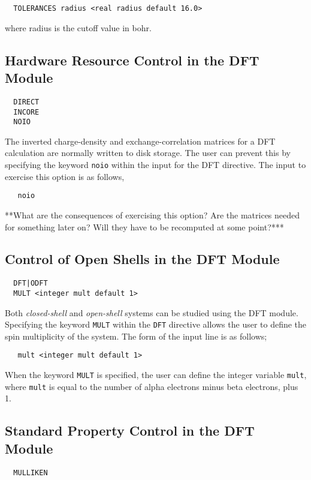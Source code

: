 \begin{verbatim}
  TOLERANCES radius <real radius default 16.0>
\end{verbatim}

where radius is the cutoff value in bohr.


\subsection{Hardware Resource Control in the DFT Module}
\begin{verbatim}
  DIRECT
  INCORE
  NOIO
\end{verbatim}

The inverted charge-density and exchange-correlation matrices
for a DFT calculation are normally written to disk storage.  The user
can prevent this by specifying the keyword \verb+noio+ within the
input for the DFT directive.  The input to exercise this option is
as follows,

\begin{verbatim}
   noio
\end{verbatim}

\Large
**What are the consequences of exercising this option?  Are the matrices
needed for something later on?  Will they have to be recomputed at some
point?***
\normalsize


\subsection{Control of Open Shells in the DFT Module}
\begin{verbatim}
  DFT|ODFT
  MULT <integer mult default 1>
\end{verbatim}

Both {\sl closed-shell} and {\sl open-shell} systems can be studied using
the DFT module.  Specifying the keyword \verb+MULT+ within the \verb+DFT+
directive allows the user to define the spin multiplicity of the system.
The form of the input line is as follows;

\begin{verbatim}
   mult <integer mult default 1> 
\end{verbatim}

When the keyword \verb+MULT+ is specified, the user can define the integer
variable \verb+mult+, where \verb+mult+ is equal to the number of alpha 
electrons minus beta electrons, plus 1.

\subsection{Standard Property Control in the DFT Module}
\begin{verbatim}
  MULLIKEN
\end{verbatim}


